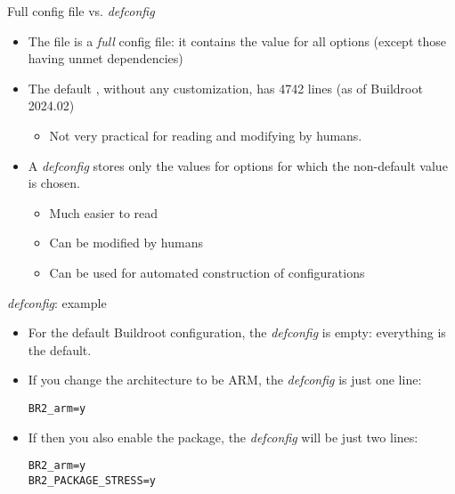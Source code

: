 \begin{frame}{Full config file vs. {\em defconfig}}
  \begin{itemize}
  \item The  file is a {\em full} config file: it
    contains the value for all options (except those having unmet
    dependencies)
  \item The default , without any customization, has
    4742 lines (as of Buildroot 2024.02)
    \begin{itemize}
    \item Not very practical for reading and modifying by humans.
    \end{itemize}
  \item A {\em defconfig} stores only the values for options for which
    the non-default value is chosen.
    \begin{itemize}
    \item Much easier to read
    \item Can be modified by humans
    \item Can be used for automated construction of configurations
    \end{itemize}
  \end{itemize}
\end{frame}

\begin{frame}[fragile]{{\em defconfig}: example}
  \begin{itemize}
  \item For the default Buildroot configuration, the {\em defconfig}
    is empty: everything is the default.
  \item If you change the architecture to be ARM, the {\em defconfig}
    is just one line:
{\small
\begin{block}{}
\begin{verbatim}
BR2_arm=y
\end{verbatim}
\end{block}
}
  \item If then you also enable the  package, the {\em
      defconfig} will be just two lines:
{\small
\begin{block}{}
\begin{verbatim}
BR2_arm=y
BR2_PACKAGE_STRESS=y
\end{verbatim}
\end{block}
}
  \end{itemize}
\end{frame}

